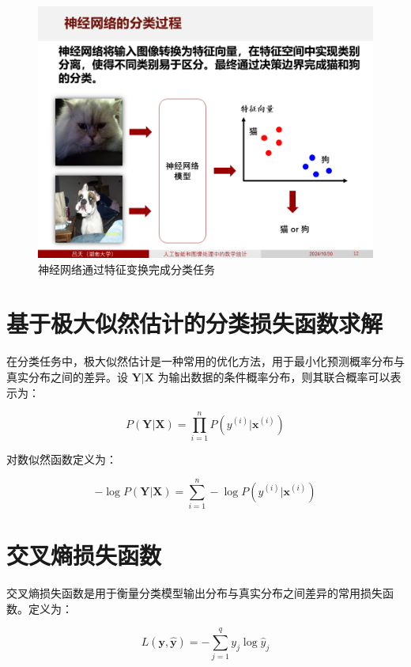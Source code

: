 \documentclass[
    report,     %
    oneside,    %
    UTF8,       %
    zihao=-4    %
]{config} %
\begin{document}
\begin{figure}[H]
    \centering
    \includegraphics[width=\linewidth]{figures/神经网络分类的原理与实现/2.PNG}
    \caption{神经网络通过特征变换完成分类任务}
\end{figure}

\section{基于极大似然估计的分类损失函数求解}

在分类任务中，极大似然估计是一种常用的优化方法，用于最小化预测概率分布与真实分布之间的差异。设 \(\mathbf{Y} | \mathbf{X}\) 为输出数据的条件概率分布，则其联合概率可以表示为：

\begin{equation}
P(\mathbf{Y}|\mathbf{X}) = \prod_{i=1}^n P(y^{(i)}|\mathbf{x}^{(i)})
\end{equation}

对数似然函数定义为：

\begin{equation}
- \log P(\mathbf{Y}|\mathbf{X}) = \sum_{i=1}^n - \log P(y^{(i)}|\mathbf{x}^{(i)})
\end{equation}

\section{交叉熵损失函数}

交叉熵损失函数是用于衡量分类模型输出分布与真实分布之间差异的常用损失函数。定义为：

\begin{equation}
L(\mathbf{y}, \hat{\mathbf{y}}) = - \sum_{j=1}^q y_j \log \hat{y}_j
\end{equation}
\end{document}
